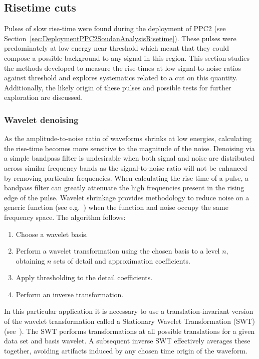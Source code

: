 		\subsection{Risetime cuts}
	     	\label{sec:RisetimeCuts}	

	Pulses of slow rise-time were found during the deployment of PPC2 (see Section~\ref{sec:DeploymentPPC2SoudanAnalysisRisetime}).  These pulses were predominately at low energy near threshold which meant that they could compose a possible background to any signal in this region.  This section studies the methods developed to measure the rise-times at low signal-to-noise ratios against threshold and explores systematics related to a cut on this quantity.  Additionally, the likely origin of these pulses and possible tests for further exploration are discussed. 
	
			\subsubsection{Wavelet denoising}
		     	\label{sec:RisetimeCutsWaveletDenoise}
					
	As the amplitude-to-noise ratio of waveforms shrinks at low energies, calculating the rise-time becomes more sensitive to the magnitude of the noise.   Denoising via a simple bandpass filter is undesirable when both signal and noise are distributed across similar frequency bands as the signal-to-noise ratio will not be enhanced by removing particular frequencies.  When calculating the rise-time of a pulse, a bandpass filter can greatly attenuate the high frequencies present in the rising edge of the pulse.  Wavelet shrinkage provides methodology to reduce noise on a generic function (see e.g.~\cite{Don95aa,Don95bb}) when the function and noise occupy the same frequency space.  The algorithm follows:
				\begin{enumerate}
					\item Choose a wavelet basis.
					\item Perform a wavelet transformation using the chosen basis to a level $n$, 
					obtaining $n$ sets of detail and approximation coefficients.
					\item Apply thresholding to the detail coefficients.
					\item Perform an inverse transformation.
				\end{enumerate}
	In this particular application it is necessary to use a translation-invariant version of the wavelet transformation called a Stationary Wavelet Transformation (SWT) (see~\cite{Coif95aa,Naso95aa}).  The SWT performs transformations at all possible translations for a given data set and basis wavelet.  A subsequent inverse SWT effectively averages these together, avoiding artifacts induced by any chosen time origin of the waveform.  
	
